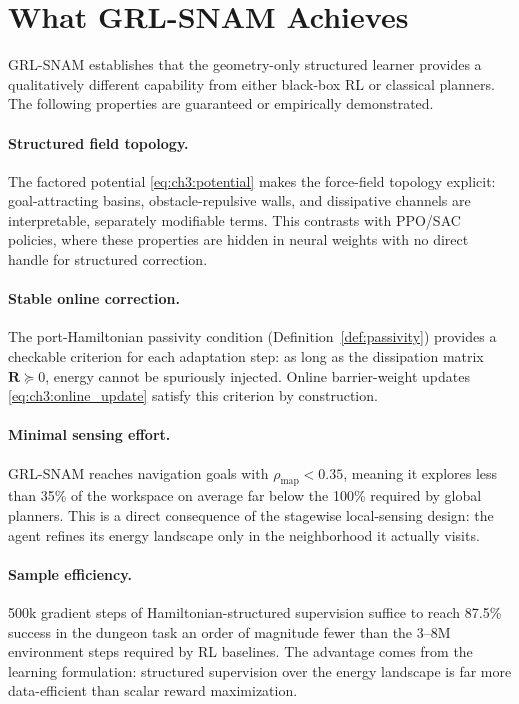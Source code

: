 \section{What GRL-SNAM Achieves}
\label{sec:ch3:strengths}

GRL-SNAM establishes that the geometry-only structured learner provides
a qualitatively different capability from either black-box RL or
classical planners.
The following properties are guaranteed or empirically demonstrated.

\paragraph{Structured field topology.}
The factored potential \cref{eq:ch3:potential} makes the force-field
topology explicit: goal-attracting basins, obstacle-repulsive walls, and
dissipative channels are interpretable, separately modifiable terms.
This contrasts with PPO/SAC policies, where these properties are
hidden in neural weights with no direct handle for structured correction.

\paragraph{Stable online correction.}
The port-Hamiltonian passivity condition (Definition~\ref{def:passivity})
provides a checkable criterion for each adaptation step: as long as
the dissipation matrix $\mathbf{R} \succeq 0$, energy cannot be
spuriously injected.
Online barrier-weight updates \cref{eq:ch3:online_update} satisfy this
criterion by construction.

\paragraph{Minimal sensing effort.}
GRL-SNAM reaches navigation goals with $\rho_{\mathrm{map}} < 0.35$,
meaning it explores less than 35\% of the workspace on average far
below the 100\% required by global planners.
This is a direct consequence of the stagewise local-sensing design:
the agent refines its energy landscape only in the neighborhood it
actually visits.

\paragraph{Sample efficiency.}
500k gradient steps of Hamiltonian-structured supervision suffice to
reach 87.5\% success in the dungeon task an order of magnitude fewer
than the 3–8M environment steps required by RL baselines.
The advantage comes from the learning formulation: structured supervision
over the energy landscape is far more data-efficient than scalar reward
maximization.

